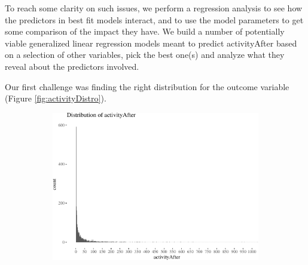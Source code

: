 \documentclass[10pt,]{scrartcl}
\begin{document}
To reach some clarity on such issues, we perform a regression analysis
to see how the predictors in best fit models interact, and to use the
model parameters to get some comparison of the impact they have. We
build a number of potentially viable generalized linear regression
models meant to predict \textsf{activityAfter} based on a selection of
other variables, pick the best one(s) and analyze what they reveal about
the predictors involved.

Our first challenge was finding the right distribution for the outcome
variable (Figure \ref{fig:activityDistro}).

\begin{figure}
\begin{subfigure}[b]{0.45\textwidth}

\begin{center}\includegraphics[width=1\linewidth]{redditAnalysisWalkthrough_files/figure-latex/unnamed-chunk-64-1} \end{center}
\end{subfigure}
\begin{subfigure}[b]{0.45\textwidth}


\end{subfigure}
\end{figure}
\end{document}
